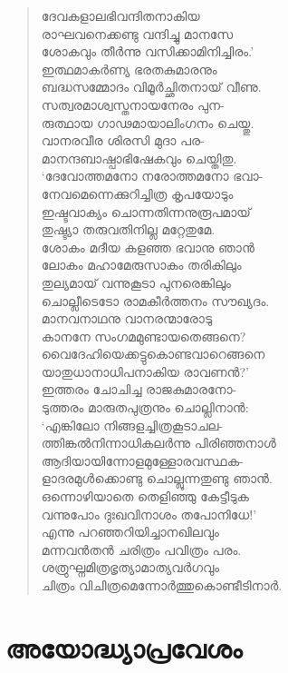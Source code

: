 \begin{verse}
ദേവകളാലഭിവന്ദിതനാകിയ\\
രാഘവനെക്കണ്ടു വന്ദിച്ചു മാനസേ\\
ശോകവും തീര്‍ന്നു വസിക്കാമിനിച്ചിരം.’\\
ഇത്ഥമാകര്‍ണ്യ ഭരതകുമാരനും\\
ബദ്ധസമ്മോദം വിമൂര്‍ച്ഛിതനായ് വീണു.\\
സത്വരമാശ്വസ്തനായനേരം പുന-\\
രുത്ഥായ ഗാഢമായാലിംഗനം ചെയ്തു.\\
വാനരവീര ശിരസി മുദാ പര-\\
മാനന്ദബാഷ്പാഭിഷേകവും ചെയ്തിതു.\\
‘ദേവോത്തമനോ നരോത്തമനോ ഭവാ-\\
നേവമെന്നെക്കുറിച്ചിത്ര കൃപയോടും\\
ഇഷ്ടവാക്യം ചൊന്നതിന്നനുരൂപമായ്\\
തുഷ്ട്യാ തരുവതിനില്ല മറ്റേതുമേ.\\
ശോകം മദീയ കളഞ്ഞ ഭവാനു ഞാന്‍\\
ലോകം മഹാമേരുസാകം തരികിലും\\
തുല്യമായ് വന്നുകൂടാ പുനരെങ്കിലും\\
ചൊല്ലീടെടോ രാമകീര്‍ത്തനം സൗഖ്യദം.\\
മാനവനാഥനു വാനരന്മാരോടു\\
കാനനേ സംഗമമുണ്ടായതെങ്ങനെ?\\
വൈദേഹിയെക്കട്ടുകൊണ്ടവാറെങ്ങനെ\\
യാതുധാനാധിപനാകിയ രാവണന്‍?’\\
ഇത്തരം ചോചിച്ച രാജകുമാരനോ-\\
ടുത്തരം മാരുതപുത്രനും ചൊല്ലിനാന്‍:\\
‘എങ്കിലോ നിങ്ങളച്ചിത്രകൂടാചല-\\
ത്തിങ്കല്‍നിന്നാധികലര്‍ന്നു പിരിഞ്ഞനാള്‍\\
ആദിയായിന്നോളമുള്ളോരവസ്ഥക-\\
ളാദരമുള്‍ക്കൊണ്ടു ചൊല്ലുന്നതുണ്ടു ഞാന്‍.\\
ഒന്നൊഴിയാതെ തെളിഞ്ഞു കേട്ടീടുക\\
വന്നുപോം ദുഃഖവിനാശം തപോനിധേ!’\\
എന്നു പറഞ്ഞറിയിച്ചാനഖിലവും\\
മന്നവന്‍തന്‍ ചരിത്രം പവിത്രം പരം.\\
ശത്രുഘ്നമിത്രഭൃത്യാമാത്യവര്‍ഗവും\\
ചിത്രം വിചിത്രമെന്നോര്‍ത്തുകൊണ്ടീടിനാര്‍.
\end{verse}


\section{അയോദ്ധ്യാപ്രവേശം}

